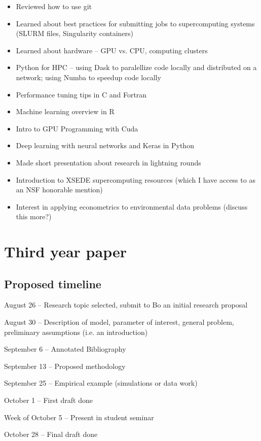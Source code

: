 \documentclass[12pt]{article}
\begin{document}
\begin{itemize}
    \item Reviewed how to use git
    \item Learned about best practices for submitting jobs to supercomputing systems (SLURM files, Singularity containers)
    \item Learned about hardware -- GPU vs. CPU, computing clusters
    \item Python for HPC -- using Dask to paralellize code locally and distributed on a network; using Numba to speedup code locally
    \item Performance tuning tips in C and Fortran
    \item Machine learning overview in R
    \item Intro to GPU Programming with Cuda
    \item Deep learning with neural networks and Keras in Python 
    \item Made short presentation about research  in lightning rounds
    \item Introduction to XSEDE supercomputing resources (which I have access to as an NSF honorable mention)
    \item Interest in applying econometrics to environmental data problems (discuss this more?)
\end{itemize}

\newpage
\section{Third year paper}
\subsection{Proposed timeline}
\noindent August 26 -- Research topic selected, submit to Bo an initial research proposal

\noindent August 30 -- Description of model, parameter of interest, general problem, preliminary assumptions (i.e. an introduction)

\noindent September 6 -- Annotated Bibliography 

\noindent September 13 -- Proposed methodology

\noindent September 25 -- Empirical example (simulations or data work) 

\noindent October 1 -- First draft done

\noindent Week of October 5 -- Present in student seminar 

\noindent October 28 -- Final draft done
\end{document}
